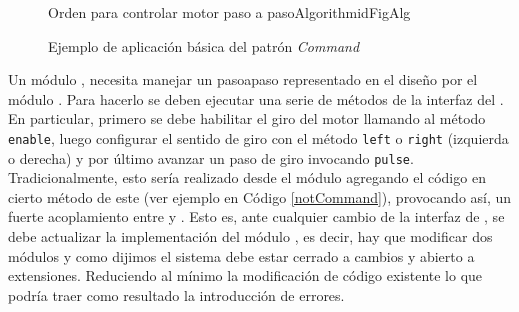 \begin{figure}[H]
\caption{Ejemplo de aplicación básica del patrón \textit{Command}}
\begin{center}
\end{center}

\begin{pattern}[]{Orden para controlar motor paso a paso}{Algorithm}{idFigAlg}
\assigns
{}
\end{pattern}

\end{figure}
Un módulo \Controller, necesita manejar un \gls{pasoapaso} representado en el diseño por el módulo \Motor. Para hacerlo se deben ejecutar una serie de métodos de la interfaz del \Motor. En particular, primero se debe habilitar el giro del motor llamando al método \verb|enable|, luego configurar el sentido de giro con el método \verb|left| o \verb|right| (izquierda o derecha) y por último avanzar un paso de giro invocando \verb|pulse|. Tradicionalmente, esto sería realizado desde el módulo \Controller agregando el código en cierto método de este (ver ejemplo en Código \ref{notCommand}), provocando así, un fuerte acoplamiento entre \Controller y \Motor. Esto es, ante cualquier cambio de la interfaz de \Motor, se debe actualizar la implementación del módulo \Controller, es decir, hay que modificar dos módulos y como dijimos el sistema debe estar cerrado a cambios y abierto a extensiones. Reduciendo al mínimo la modificación de código existente lo que podría traer como resultado la introducción de errores.


